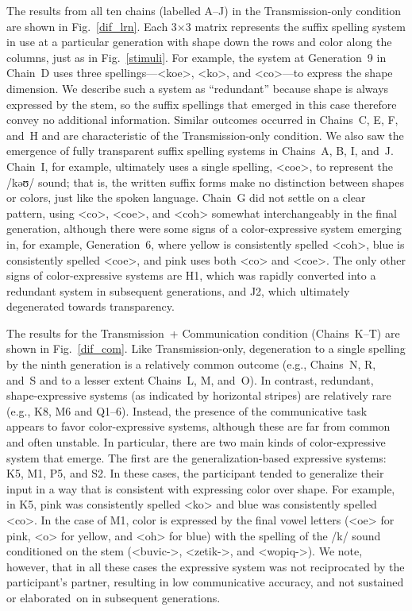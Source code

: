 \documentclass[doc,biblatex]{apa7}
\begin{document}
The results from all ten chains (labelled A--J) in the Transmission-only condition are shown in Fig.~\ref{dif_lrn}. Each 3×3 matrix represents the suffix spelling system in use at a particular generation with shape down the rows and color along the columns, just as in Fig.~\ref{stimuli}. For example, the system at Generation~9 in Chain~D uses three spellings---<koe>, <ko>, and <co>---to express the shape dimension. We describe such a system as ``redundant'' because shape is always expressed by the stem, so the suffix spellings that emerged in this case therefore convey no additional information. Similar outcomes occurred in Chains~C, E, F, and~H and are characteristic of the Transmission-only condition. We also saw the emergence of fully transparent suffix spelling systems in Chains~A, B, I, and~J. Chain~I, for example, ultimately uses a single spelling, <coe>, to represent the /kəʊ/ sound; that is, the written suffix forms make no distinction between shapes or colors, just like the spoken language. Chain~G did not settle on a clear pattern, using <co>, <coe>, and <coh> somewhat interchangeably in the final generation, although there were some signs of a color-expressive system emerging in, for example, Generation~6, where yellow is consistently spelled <coh>, blue is consistently spelled <coe>, and pink uses both <co> and <coe>. The only other signs of color-expressive systems are H1, which was rapidly converted into a redundant system in subsequent generations, and J2, which ultimately degenerated towards transparency.

The results for the Transmission~+ Communication condition (Chains~K--T) are shown in Fig.~\ref{dif_com}. Like Transmission-only, degeneration to a single spelling by the ninth generation is a relatively common outcome (e.g., Chains~N, R, and~S and to a lesser extent Chains~L, M, and~O). In contrast, redundant, shape-expressive systems (as indicated by horizontal stripes) are relatively rare (e.g., K8, M6 and Q1--6). Instead, the presence of the communicative task appears to favor color-expressive systems, although these are far from common and often unstable. In particular, there are two main kinds of color-expressive system that emerge. The first are the generalization-based expressive systems: K5, M1, P5, and S2. In these cases, the participant tended to generalize their input in a way that is consistent with expressing color over shape. For example, in K5, pink was consistently spelled <ko> and blue was consistently spelled <co>. In the case of M1, color is expressed by the final vowel letters (<oe> for pink, <o> for yellow, and <oh> for blue) with the spelling of the /k/ sound conditioned on the stem (<buvic->, <zetik->, and <wopiq->). We note, however, that in all these cases the expressive system was not reciprocated by the participant's partner, resulting in low communicative accuracy, and not sustained or elaborated~on in subsequent generations.
\end{document}
